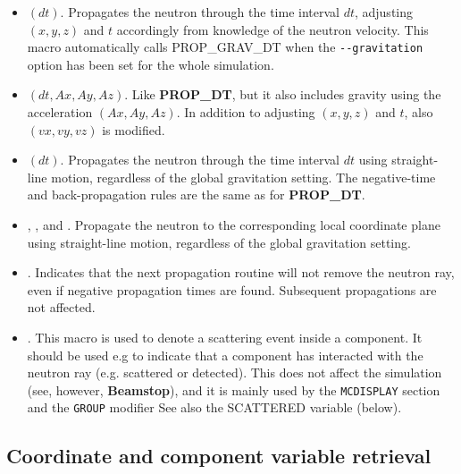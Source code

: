 \begin{itemize}
  For components that are centered along the $z$-axis,
  use the \verb+_intersect+ functions to determine intersection time(s),
  and then a \verb+PROP_DT+ call.
\item {}$(dt)$. Propagates the neutron through the
  time interval $dt$, adjusting $(x,y,z)$ and $t$ accordingly
  from knowledge of the neutron velocity. This macro automatically calls PROP\_GRAV\_DT when the \verb+--gravitation+ option has been set for the whole simulation.
\item {}$(dt,Ax,Ay,Az)$. Like \textbf{PROP\_DT}, but it also
  includes gravity using the acceleration $(Ax,Ay,Az)$. In addition
  to adjusting $(x,y,z)$ and $t$, also $(vx,vy,vz)$ is modified.
\item {}$(dt)$. Propagates the neutron through the
  time interval $dt$ using straight-line motion, regardless of the global
  gravitation setting. The negative-time and back-propagation rules are the
  same as for \textbf{PROP\_DT}.
\item {}, , and
  . Propagate the neutron to the corresponding
  local coordinate plane using straight-line motion, regardless of the global
  gravitation setting.
\item {}. Indicates that the next propagation routine
  will not remove the neutron ray, even if negative propagation times
  are found. Subsequent propagations are not affected.
\item {}. This macro is used to denote a scattering event
  inside a component.
  It should be used e.g
  to indicate that a component has interacted with the neutron ray
  (e.g. scattered or detected).
  This does not affect the simulation (see, however, \textbf{Beamstop}),
  and it is mainly used by the
  \verb+MCDISPLAY+ section and the \verb+GROUP+ modifier
  See also the SCATTERED variable (below).
\end{itemize}

\subsection{Coordinate and component variable retrieval}

